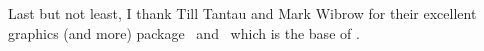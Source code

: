 Last but not least, I thank Till Tantau and Mark Wibrow for their excellent graphics (and more) package \PGF\ and \Tikz\ which is the base of \PGFPlots.

%
%
%
%
%
%

\printindex



